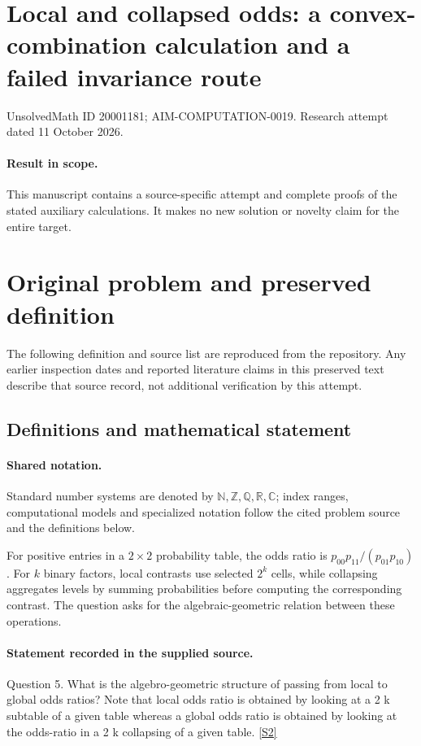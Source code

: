 \documentclass[11pt]{article}
\begin{document}
\section*{Local and collapsed odds: a convex-combination calculation and a failed invariance route}
\noindent UnsolvedMath ID 20001181; AIM-COMPUTATION-0019. Research attempt dated 11 October 2026.
\paragraph{Result in scope.}This manuscript contains a source-specific attempt and complete proofs of the stated auxiliary calculations. It makes no new solution or novelty claim for the entire target.
\section{Original problem and preserved definition}
The following definition and source list are reproduced from the repository. Any earlier inspection dates and reported literature claims in this preserved text describe that source record, not additional verification by this attempt.
\subsection{Definitions and mathematical statement}

\paragraph{Shared notation.}Standard number systems are denoted by $\mathbb N,\mathbb Z,\mathbb Q,\mathbb R,\mathbb C$; index ranges, computational models and specialized notation follow the cited problem source and the definitions below.


For positive entries in a $2\times2$ probability table, the odds ratio is $p_{00}p_{11}/(p_{01}p_{10})$. For $k$ binary factors, local contrasts use selected $2^k$ cells, while collapsing aggregates levels by summing probabilities before computing the corresponding contrast. The question asks for the algebraic-geometric relation between these operations.
\paragraph{Statement recorded in the supplied source.}
Question 5. What is the algebro-geometric structure of passing from local to global odds ratios? Note that local odds ratio is obtained by looking at a 2 k subtable of a given table whereas a global odds ratio is obtained by looking at the odds-ratio in a 2 k collapsing of a given table. \href{https://aimath.org/WWN/compalgstat/compalgstat.pdf}{[S2]}
\end{document}
